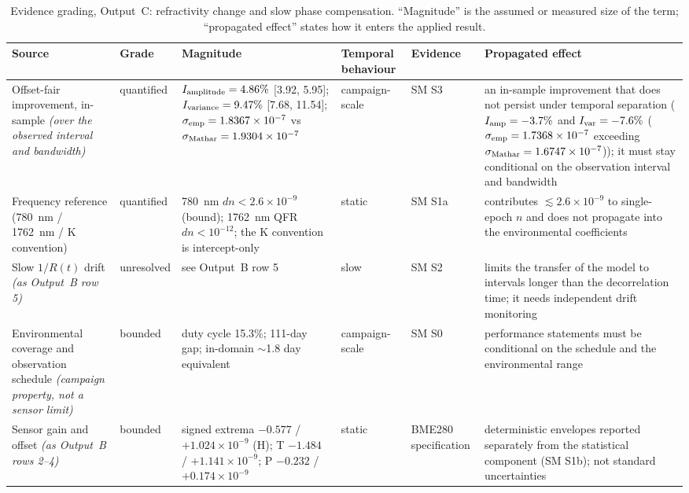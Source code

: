 \documentclass[aps,prapplied,reprint,superscriptaddress]{revtex4-2}
\begin{document}
\begin{table}[tbp]
\centering
\caption{Evidence grading, Output~C: refractivity change and slow phase compensation. ``Magnitude'' is the assumed or measured size of the term; ``propagated effect'' states how it enters the applied result.}
\label{tab:S4c}
\footnotesize
\setlength{\tabcolsep}{4pt}
\begin{tabular}{@{}p{}p{}p{}p{}p{}p{}@{}}
\hline
\textbf{Source} & \textbf{Grade} & \textbf{Magnitude} & \textbf{Temporal behaviour} & \textbf{Evidence} & \textbf{Propagated effect} \\
\hline
Offset-fair improvement, in-sample \emph{(over the observed interval and bandwidth)} & quantified & $I_{\rm amplitude} = 4.86\%$ [3.92, 5.95]; $I_{\rm variance} = 9.47\%$ [7.68, 11.54]; $\sigma_{\rm emp} = 1.8367\times10^{-7}$ vs $\sigma_{\rm Mathar} = 1.9304\times10^{-7}$ & campaign-scale & SM S3 & an in-sample improvement that does not persist under temporal separation ($I_{\rm amp} = -3.7\%$ and $I_{\rm var} = -7.6\%$ ($\sigma_{\rm emp} = 1.7368\times10^{-7}$ exceeding $\sigma_{\rm Mathar} = 1.6747\times10^{-7}$)); it must stay conditional on the observation interval and bandwidth  \\
Frequency reference (\SI{780}{\nano\meter} / \SI{1762}{\nano\meter} / K convention) & quantified & \SI{780}{\nano\meter} $dn < 2.6\times10^{-9}$ (bound); \SI{1762}{\nano\meter} QFR $dn < 10^{-12}$; the K convention is intercept-only & static & SM S1a & contributes $\lesssim 2.6\times10^{-9}$ to single-epoch $n$ and does not propagate into the environmental coefficients  \\
Slow $1/R(t)$ drift \emph{(as Output~B row 5)} & unresolved & see Output~B row 5 & slow & SM S2 & limits the transfer of the model to intervals longer than the decorrelation time; it needs independent drift monitoring  \\
Environmental coverage and observation schedule \emph{(campaign property, not a sensor limit)} & bounded & duty cycle 15.3\%; 111-day gap; in-domain $\sim$1.8 day equivalent & campaign-scale & SM S0 & performance statements must be conditional on the schedule and the environmental range  \\
Sensor gain and offset \emph{(as Output~B rows 2--4)} & bounded & signed extrema $-0.577$ / $+1.024\times10^{-9}$ (H); T $-1.484$ / $+1.141\times10^{-9}$; P $-0.232$ / $+0.174\times10^{-9}$ & static & BME280 specification & deterministic envelopes reported separately from the statistical component (SM S1b); not standard uncertainties  \\
\hline
\end{tabular}
\end{table}


\end{document}

